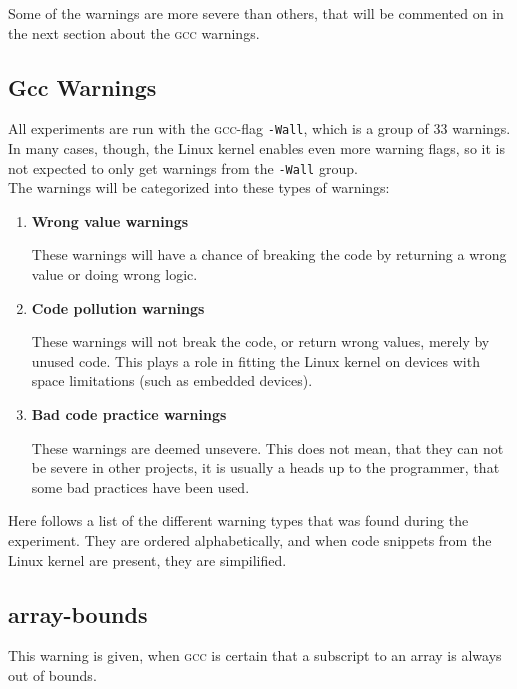 \documentclass[a4paper,11pt]{report}
\newcommand{\textcode}[1]{\fboxsep=1pt\texttt{\colorbox{gray!20}{#1}}}
\begin{document}
Some of the warnings are more severe than others, that will be commented on in 
the next section about the \textsc{gcc} warnings.
\\



            \subsection{Gcc Warnings}
            \label{sec:gccwarns}
All experiments are run with the \textsc{gcc}-flag 
\textcode{-Wall}, which is a group of 33 warnings. In many cases, though, 
the Linux kernel enables even more warning flags, so it is not expected to only 
get warnings from the \texttt{-Wall} group.
\\

The warnings will be categorized into these types of warnings:

\begin{enumerate}
    \item \textbf{Wrong value warnings}

These warnings will have a chance of breaking the code by returning a wrong
value or doing wrong logic.

    \item \textbf{Code pollution warnings}

These warnings will not break the code, or return wrong values, merely by 
unused code. This plays a role in fitting the Linux kernel on devices with 
space limitations (such as embedded devices).

    \item \textbf{Bad code practice warnings}

These warnings are deemed unsevere. This does not mean, that they can not be 
severe in other projects, it is usually a heads up to the programmer, that some 
bad practices have been used.

\end{enumerate}


Here follows a list of the different warning types that was found during the 
experiment.  They are ordered alphabetically, and when code snippets from the 
Linux kernel are present, they are simpilified.


            \subsection*{array-bounds}
This warning is given, when \textsc{gcc} is certain that a subscript to an array is always 
out of bounds.
\end{document}
